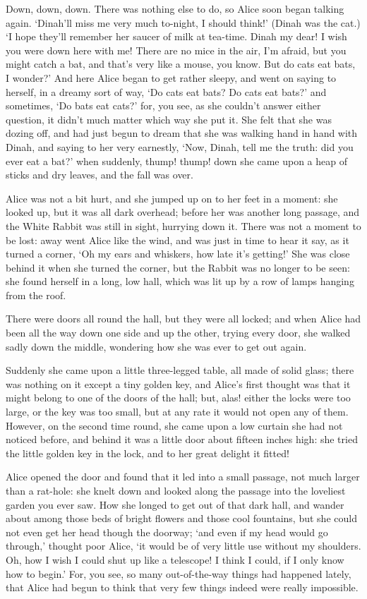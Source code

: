 \documentclass[12pt]{book}
\begin{document}
  Down, down, down.  There was nothing else to do, so Alice soon
began talking again.  `Dinah'll miss me very much to-night, I
should think!'  (Dinah was the cat.)  `I hope they'll remember
her saucer of milk at tea-time.  Dinah my dear!  I wish you were
down here with me!  There are no mice in the air, I'm afraid, but
you might catch a bat, and that's very like a mouse, you know.
But do cats eat bats, I wonder?'  And here Alice began to get
rather sleepy, and went on saying to herself, in a dreamy sort of
way, `Do cats eat bats?  Do cats eat bats?' and sometimes, `Do
bats eat cats?' for, you see, as she couldn't answer either
question, it didn't much matter which way she put it.  She felt
that she was dozing off, and had just begun to dream that she
was walking hand in hand with Dinah, and saying to her very
earnestly, `Now, Dinah, tell me the truth:  did you ever eat a
bat?' when suddenly, thump! thump! down she came upon a heap of
sticks and dry leaves, and the fall was over.

  Alice was not a bit hurt, and she jumped up on to her feet in a
moment:  she looked up, but it was all dark overhead; before her
was another long passage, and the White Rabbit was still in
sight, hurrying down it.  There was not a moment to be lost:
away went Alice like the wind, and was just in time to hear it
say, as it turned a corner, `Oh my ears and whiskers, how late
it's getting!'  She was close behind it when she turned the
corner, but the Rabbit was no longer to be seen:  she found
herself in a long, low hall, which was lit up by a row of lamps
hanging from the roof.

  There were doors all round the hall, but they were all locked;
and when Alice had been all the way down one side and up the
other, trying every door, she walked sadly down the middle,
wondering how she was ever to get out again.

  Suddenly she came upon a little three-legged table, all made of
solid glass; there was nothing on it except a tiny golden key,
and Alice's first thought was that it might belong to one of the
doors of the hall; but, alas! either the locks were too large, or
the key was too small, but at any rate it would not open any of
them.  However, on the second time round, she came upon a low
curtain she had not noticed before, and behind it was a little
door about fifteen inches high:  she tried the little golden key
in the lock, and to her great delight it fitted!

  Alice opened the door and found that it led into a small
passage, not much larger than a rat-hole:  she knelt down and
looked along the passage into the loveliest garden you ever saw.
How she longed to get out of that dark hall, and wander about
among those beds of bright flowers and those cool fountains, but
she could not even get her head though the doorway; `and even if
my head would go through,' thought poor Alice, `it would be of
very little use without my shoulders.  Oh, how I wish
I could shut up like a telescope!  I think I could, if I only
know how to begin.'  For, you see, so many out-of-the-way things
had happened lately, that Alice had begun to think that very few
things indeed were really impossible.
\end{document}
